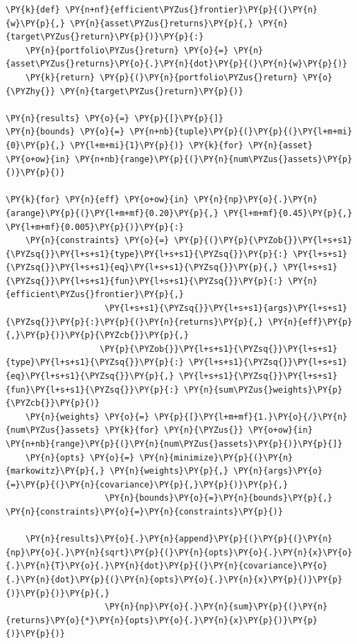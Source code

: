 \begin{codebox}
\begin{Verbatim}[commandchars=\\\{\}]
\PY{k}{def} \PY{n+nf}{efficient\PYZus{}frontier}\PY{p}{(}\PY{n}{w}\PY{p}{,} \PY{n}{asset\PYZus{}returns}\PY{p}{,} \PY{n}{target\PYZus{}return}\PY{p}{)}\PY{p}{:} 
    \PY{n}{portfolio\PYZus{}return} \PY{o}{=} \PY{n}{asset\PYZus{}returns}\PY{o}{.}\PY{n}{dot}\PY{p}{(}\PY{n}{w}\PY{p}{)} 
    \PY{k}{return} \PY{p}{(}\PY{n}{portfolio\PYZus{}return} \PY{o}{\PYZhy{}} \PY{n}{target\PYZus{}return}\PY{p}{)}
		
\PY{n}{results} \PY{o}{=} \PY{p}{[}\PY{p}{]}
\PY{n}{bounds} \PY{o}{=} \PY{n+nb}{tuple}\PY{p}{(}\PY{p}{(}\PY{l+m+mi}{0}\PY{p}{,} \PY{l+m+mi}{1}\PY{p}{)} \PY{k}{for} \PY{n}{asset} \PY{o+ow}{in} \PY{n+nb}{range}\PY{p}{(}\PY{n}{num\PYZus{}assets}\PY{p}{)}\PY{p}{)}
		
\PY{k}{for} \PY{n}{eff} \PY{o+ow}{in} \PY{n}{np}\PY{o}{.}\PY{n}{arange}\PY{p}{(}\PY{l+m+mf}{0.20}\PY{p}{,} \PY{l+m+mf}{0.45}\PY{p}{,} \PY{l+m+mf}{0.005}\PY{p}{)}\PY{p}{:}
    \PY{n}{constraints} \PY{o}{=} \PY{p}{(}\PY{p}{\PYZob{}}\PY{l+s+s1}{\PYZsq{}}\PY{l+s+s1}{type}\PY{l+s+s1}{\PYZsq{}}\PY{p}{:} \PY{l+s+s1}{\PYZsq{}}\PY{l+s+s1}{eq}\PY{l+s+s1}{\PYZsq{}}\PY{p}{,} \PY{l+s+s1}{\PYZsq{}}\PY{l+s+s1}{fun}\PY{l+s+s1}{\PYZsq{}}\PY{p}{:} \PY{n}{efficient\PYZus{}frontier}\PY{p}{,} 
                    \PY{l+s+s1}{\PYZsq{}}\PY{l+s+s1}{args}\PY{l+s+s1}{\PYZsq{}}\PY{p}{:}\PY{p}{(}\PY{n}{returns}\PY{p}{,} \PY{n}{eff}\PY{p}{,}\PY{p}{)}\PY{p}{\PYZcb{}}\PY{p}{,}
                   \PY{p}{\PYZob{}}\PY{l+s+s1}{\PYZsq{}}\PY{l+s+s1}{type}\PY{l+s+s1}{\PYZsq{}}\PY{p}{:} \PY{l+s+s1}{\PYZsq{}}\PY{l+s+s1}{eq}\PY{l+s+s1}{\PYZsq{}}\PY{p}{,} \PY{l+s+s1}{\PYZsq{}}\PY{l+s+s1}{fun}\PY{l+s+s1}{\PYZsq{}}\PY{p}{:} \PY{n}{sum\PYZus{}weights}\PY{p}{\PYZcb{}}\PY{p}{)}
    \PY{n}{weights} \PY{o}{=} \PY{p}{[}\PY{l+m+mf}{1.}\PY{o}{/}\PY{n}{num\PYZus{}assets} \PY{k}{for} \PY{n}{\PYZus{}} \PY{o+ow}{in} \PY{n+nb}{range}\PY{p}{(}\PY{n}{num\PYZus{}assets}\PY{p}{)}\PY{p}{]}
    \PY{n}{opts} \PY{o}{=} \PY{n}{minimize}\PY{p}{(}\PY{n}{markowitz}\PY{p}{,} \PY{n}{weights}\PY{p}{,} \PY{n}{args}\PY{o}{=}\PY{p}{(}\PY{n}{covariance}\PY{p}{,}\PY{p}{)}\PY{p}{,}
                    \PY{n}{bounds}\PY{o}{=}\PY{n}{bounds}\PY{p}{,} \PY{n}{constraints}\PY{o}{=}\PY{n}{constraints}\PY{p}{)} 
		
    \PY{n}{results}\PY{o}{.}\PY{n}{append}\PY{p}{(}\PY{p}{(}\PY{n}{np}\PY{o}{.}\PY{n}{sqrt}\PY{p}{(}\PY{n}{opts}\PY{o}{.}\PY{n}{x}\PY{o}{.}\PY{n}{T}\PY{o}{.}\PY{n}{dot}\PY{p}{(}\PY{n}{covariance}\PY{o}{.}\PY{n}{dot}\PY{p}{(}\PY{n}{opts}\PY{o}{.}\PY{n}{x}\PY{p}{)}\PY{p}{)}\PY{p}{)}\PY{p}{,}
                    \PY{n}{np}\PY{o}{.}\PY{n}{sum}\PY{p}{(}\PY{n}{returns}\PY{o}{*}\PY{n}{opts}\PY{o}{.}\PY{n}{x}\PY{p}{)}\PY{p}{)}\PY{p}{)} 
\end{Verbatim}
\end{codebox}

